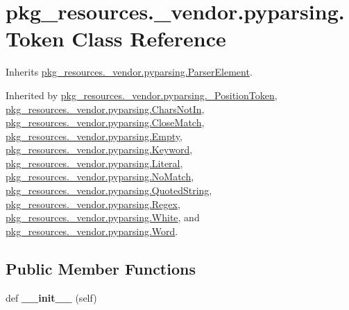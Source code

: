 \hypertarget{classpkg__resources_1_1__vendor_1_1pyparsing_1_1_token}{}\section{pkg\+\_\+resources.\+\_\+vendor.\+pyparsing.\+Token Class Reference}
\label{classpkg__resources_1_1__vendor_1_1pyparsing_1_1_token}


Inherits \hyperlink{classpkg__resources_1_1__vendor_1_1pyparsing_1_1_parser_element}{pkg\+\_\+resources.\+\_\+vendor.\+pyparsing.\+Parser\+Element}.



Inherited by \hyperlink{classpkg__resources_1_1__vendor_1_1pyparsing_1_1___position_token}{pkg\+\_\+resources.\+\_\+vendor.\+pyparsing.\+\_\+\+Position\+Token}, \hyperlink{classpkg__resources_1_1__vendor_1_1pyparsing_1_1_chars_not_in}{pkg\+\_\+resources.\+\_\+vendor.\+pyparsing.\+Chars\+Not\+In}, \hyperlink{classpkg__resources_1_1__vendor_1_1pyparsing_1_1_close_match}{pkg\+\_\+resources.\+\_\+vendor.\+pyparsing.\+Close\+Match}, \hyperlink{classpkg__resources_1_1__vendor_1_1pyparsing_1_1_empty}{pkg\+\_\+resources.\+\_\+vendor.\+pyparsing.\+Empty}, \hyperlink{classpkg__resources_1_1__vendor_1_1pyparsing_1_1_keyword}{pkg\+\_\+resources.\+\_\+vendor.\+pyparsing.\+Keyword}, \hyperlink{classpkg__resources_1_1__vendor_1_1pyparsing_1_1_literal}{pkg\+\_\+resources.\+\_\+vendor.\+pyparsing.\+Literal}, \hyperlink{classpkg__resources_1_1__vendor_1_1pyparsing_1_1_no_match}{pkg\+\_\+resources.\+\_\+vendor.\+pyparsing.\+No\+Match}, \hyperlink{classpkg__resources_1_1__vendor_1_1pyparsing_1_1_quoted_string}{pkg\+\_\+resources.\+\_\+vendor.\+pyparsing.\+Quoted\+String}, \hyperlink{classpkg__resources_1_1__vendor_1_1pyparsing_1_1_regex}{pkg\+\_\+resources.\+\_\+vendor.\+pyparsing.\+Regex}, \hyperlink{classpkg__resources_1_1__vendor_1_1pyparsing_1_1_white}{pkg\+\_\+resources.\+\_\+vendor.\+pyparsing.\+White}, and \hyperlink{classpkg__resources_1_1__vendor_1_1pyparsing_1_1_word}{pkg\+\_\+resources.\+\_\+vendor.\+pyparsing.\+Word}.

\subsection*{Public Member Functions}
\begin{DoxyCompactItemize}
\item 
\mbox{\label{classpkg__resources_1_1__vendor_1_1pyparsing_1_1_token_a2891da2d424f372ad254cebfb21c8da4}} 
def {\bfseries \+\_\+\+\_\+init\+\_\+\+\_\+} (self)
\end{DoxyCompactItemize}
